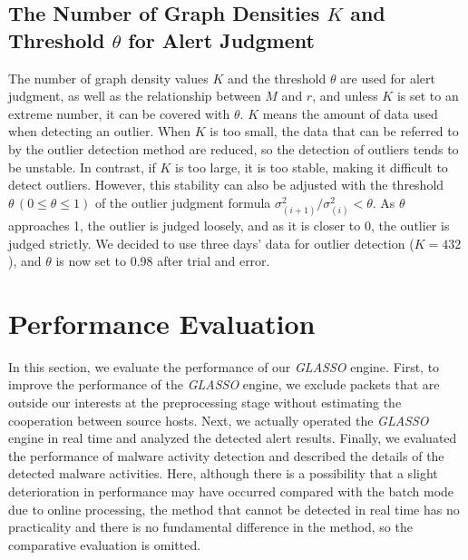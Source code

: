 \documentclass[conference]{IEEEtran}
\begin{document}
\subsection{The Number of Graph Densities $K$ and Threshold $\theta$ for Alert Judgment}
The number of graph density values $K$ and the threshold $\theta$ are used for alert judgment, as well as the relationship between $M$ and $r$, and unless $K$ is set to an extreme number, it can be covered with $\theta$.
$K$ means the amount of data used when detecting an outlier.
When $K$ is too small, the data that can be referred to by the outlier detection method are reduced, so the detection of outliers tends to be unstable.
In contrast, if $K$ is too large, it is too stable, making it difficult to detect outliers.
However, this stability can also be adjusted with the threshold $\theta \, (0\leq \theta \leq 1)$ of the outlier judgment formula $\sigma^{2}_{(i+1)}/\sigma^{2}_{(i)}<\theta$.
As $\theta$ approaches 1, the outlier is judged loosely, and as it is closer to 0, the outlier is judged strictly.
We decided to use three days' data for outlier detection ($K=432$), and $\theta$ is now set to 0.98 after trial and error.



\section{Performance Evaluation}
In this section, we evaluate the performance of our \textit{GLASSO} engine.
First, to improve the performance of the \textit{GLASSO} engine, we exclude packets that are outside our interests at the preprocessing stage without estimating the cooperation between source hosts.
Next, we actually operated the \textit{GLASSO} engine in real time and analyzed the detected alert results.
Finally, we evaluated the performance of malware activity detection and described the details of the detected malware activities.
Here, although there is a possibility that a slight deterioration in performance may have occurred compared with the batch mode due to online processing, the method that cannot be detected in real time has no practicality and there is no fundamental difference in the method, so the comparative evaluation is omitted.
\end{document}
